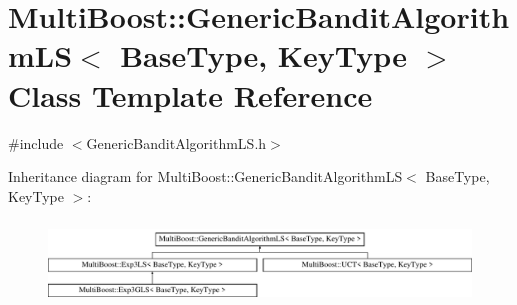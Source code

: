\hypertarget{classMultiBoost_1_1GenericBanditAlgorithmLS}{\section{Multi\-Boost\-:\-:Generic\-Bandit\-Algorithm\-L\-S$<$ Base\-Type, Key\-Type $>$ Class Template Reference}
\label{classMultiBoost_1_1GenericBanditAlgorithmLS}
}


{\ttfamily \#include $<$Generic\-Bandit\-Algorithm\-L\-S.\-h$>$}

Inheritance diagram for Multi\-Boost\-:\-:Generic\-Bandit\-Algorithm\-L\-S$<$ Base\-Type, Key\-Type $>$\-:\begin{figure}[H]
\begin{center}
\leavevmode
\includegraphics[height=2.264151cm]{classMultiBoost_1_1GenericBanditAlgorithmLS}
\end{center}
\end{figure}
